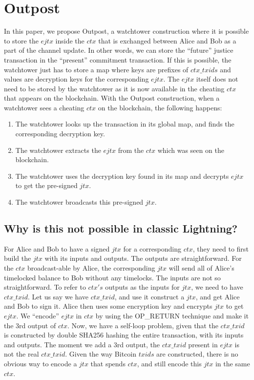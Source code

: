 \section{Outpost} %
In this paper, we propose Outpost, a watchtower construction where it is possible to store the $\mathit{ejtx}$ inside the $\mathit{ctx}$ that is exchanged between Alice and Bob as a part of the channel update. In other words, we can store the ``future'' justice transaction in the ``present'' commitment transaction. If this is possible, the watchtower just has to store a map where keys are prefixes of $\mathit{ctx\_txids}$ and values are decryption keys for the corresponding $\mathit{ejtx}$. The $\mathit{ejtx}$ itself does not need to be stored by the watchtower as it is now available in the cheating $\mathit{ctx}$ that appears on the blockchain. With the Outpost construction, when a watchtower sees a cheating $\mathit{ctx}$ on the blockchain, the following happens:
\begin{enumerate}
\item The watchtower looks up the transaction in its global map, and finds the corresponding decryption key.
\item The watchtower extracts the $\mathit{ejtx}$ from the $\mathit{ctx}$ which was seen on the blockchain.
\item The watchtower uses the decryption key found in its map and decrypts $\mathit{ejtx}$ to get the pre-signed $\mathit{jtx}$.
\item The watchtower broadcasts this pre-signed $\mathit{jtx}$.
\end{enumerate}

\subsection{Why is this not possible in classic Lightning?}

For Alice and Bob to have a signed $\mathit{jtx}$ for a corresponding $\mathit{ctx}$, they need to first build the $\mathit{jtx}$ with its inputs and outputs. The outputs are straightforward. For the $\mathit{ctx}$ broadcast-able by Alice, the corresponding $\mathit{jtx}$ will send all of Alice's timelocked balance to Bob without any timelocks. The inputs are not so straightforward. To refer to $\mathit{ctx's}$ outputs as the inputs for $\mathit{jtx}$, we need to have $\mathit{ctx\_txid}$. Let us say we have $\mathit{ctx\_txid}$, and use it construct a $\mathit{jtx}$, and get Alice and Bob to sign it. Alice then uses some encryption key and encrypts $\mathit{jtx}$ to get $\mathit{ejtx}$. We ``encode'' $\mathit{ejtx}$ in $\mathit{ctx}$ by using the OP\_RETURN technique and make it the 3rd output of $\mathit{ctx}$. Now, we have a self-loop problem, given that the $\mathit{ctx\_txid}$ is constructed by double SHA256 hashing the entire transaction, with its inputs and outputs. The moment we add a 3rd output, the $\mathit{ctx\_txid}$ present in $\mathit{ejtx}$ is not the real $\mathit{ctx\_txid}$. Given the way Bitcoin $\mathit{txids}$ are constructed, there is no obvious way to encode a $\mathit{jtx}$ that spends $\mathit{ctx}$, and still encode this $\mathit{jtx}$ in the same $\mathit{ctx}$.


